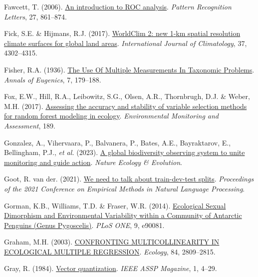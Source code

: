 \documentclass[
  letterpaper,
]{scrbook}
\newlength{\cslhangindent}
\newenvironment{CSLReferences}[2] %
 {\begin{list}{}{%
  \setlength{\itemindent}{0pt}
  \setlength{\leftmargin}{0pt}
  \setlength{\parsep}{0pt}
  \ifodd #1
   \setlength{\leftmargin}{\cslhangindent}
   \setlength{\itemindent}{-1\cslhangindent}
  \fi
  \setlength{\itemsep}{#2\baselineskip}}}
 {\end{list}}
\begin{document}
\begin{CSLReferences}{1}{0}
Fawcett, T. (2006).
\href{https://doi.org/10.1016/j.patrec.2005.10.010}{An introduction to
ROC analysis}. \emph{Pattern Recognition Letters}, 27, 861--874.

Fick, S.E. \& Hijmans, R.J. (2017).
\href{https://doi.org/10.1002/joc.5086}{WorldClim 2: new 1{-}km spatial
resolution climate surfaces for global land areas}. \emph{International
Journal of Climatology}, 37, 4302--4315.

Fisher, R.A. (1936).
\href{https://doi.org/10.1111/j.1469-1809.1936.tb02137.x}{The Use Of
Multiple Measurements In Taxonomic Problems}. \emph{Annals of Eugenics},
7, 179--188.

Fox, E.W., Hill, R.A., Leibowitz, S.G., Olsen, A.R., Thornbrugh, D.J. \&
Weber, M.H. (2017).
\href{https://doi.org/10.1007/s10661-017-6025-0}{Assessing the accuracy
and stability of variable selection methods for random forest modeling
in ecology}. \emph{Environmental Monitoring and Assessment}, 189.

Gonzalez, A., Vihervaara, P., Balvanera, P., Bates, A.E., Bayraktarov,
E., Bellingham, P.J., \emph{et al.} (2023).
\href{https://doi.org/10.1038/s41559-023-02171-0}{A global biodiversity
observing system to unite monitoring and guide action}. \emph{Nature
Ecology \& Evolution}.

Goot, R. van der. (2021).
\href{https://doi.org/10.18653/v1/2021.emnlp-main.368}{We need to talk
about train-dev-test splits}. \emph{Proceedings of the 2021 Conference
on Empirical Methods in Natural Language Processing}.

Gorman, K.B., Williams, T.D. \& Fraser, W.R. (2014).
\href{https://doi.org/10.1371/journal.pone.0090081}{Ecological Sexual
Dimorphism and Environmental Variability within a Community of Antarctic
Penguins (Genus Pygoscelis)}. \emph{PLoS ONE}, 9, e90081.

Graham, M.H. (2003). \href{https://doi.org/10.1890/02-3114}{CONFRONTING
MULTICOLLINEARITY IN ECOLOGICAL MULTIPLE REGRESSION}. \emph{Ecology},
84, 2809--2815.

Gray, R. (1984).
\href{https://doi.org/10.1109/massp.1984.1162229}{Vector quantization}.
\emph{IEEE ASSP Magazine}, 1, 4--29.


\end{CSLReferences}
\end{document}
